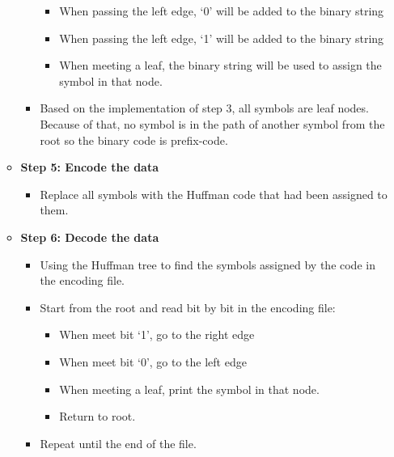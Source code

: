 \begin{enumerate}[label=\textbf{\Alph*.}]
\begin{itemize}
\begin{itemize}
                    \begin{itemize}
                        \item When passing the left edge, ‘0’ will be added to the binary string
                        \item When passing the left edge, ‘1’ will be added to the binary string
                        \item When meeting a leaf, the binary string will be used to assign the symbol in that node.
                    \end{itemize}
                    \item Based on the implementation of step 3, all symbols are leaf nodes. Because of that, no symbol is in the path of another symbol from the root so the binary code is prefix-code.
                \end{itemize}
            \item \textbf{Step 5: Encode the data}
                \begin{itemize}
                    \item Replace all symbols with the Huffman code that had been assigned to them.
                \end{itemize}
            \item \textbf{Step 6: Decode the data}
                \begin{itemize}
                    \item Using the Huffman tree to find the symbols assigned by the code in the encoding file.
                    \item Start from the root and read bit by bit in the encoding file:
                    \begin{itemize}
                        \item When meet bit ‘1’, go to the right edge
                        \item When meet bit ‘0’, go to the left edge
                        \item When meeting a leaf, print the symbol in that node.
                        \item Return to root.
                    \end{itemize}
                    \item Repeat until the end of the file.

                \end{itemize}
        \end{itemize}
        
\end{enumerate}
